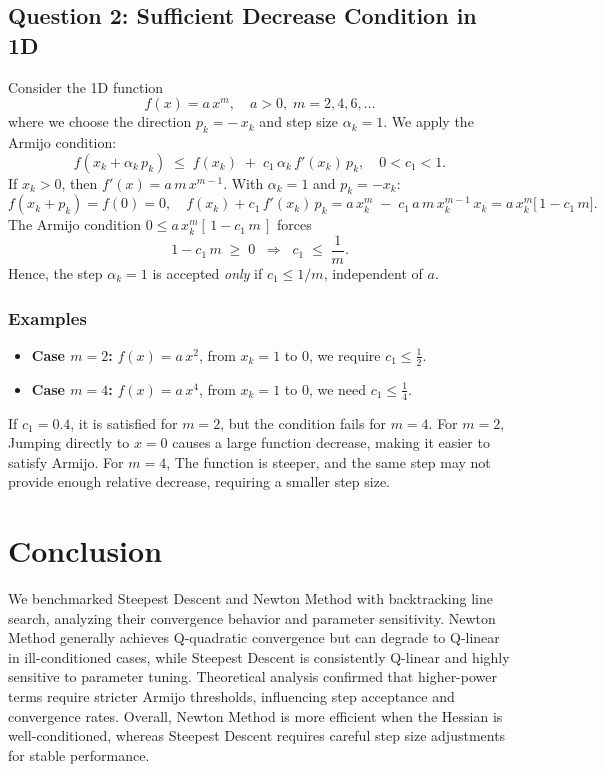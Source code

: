 \documentclass[12pt]{article}
\begin{document}
\subsection{Question 2: Sufficient Decrease Condition in 1D}

Consider the 1D function
\[
f(x) = a \, x^m, \quad a>0, \; m = 2,4,6,\dots
\]
where we choose the direction $p_k = -\,x_k$ and step size $\alpha_k=1$. 
We apply the Armijo condition:
\[
f(x_k + \alpha_k\,p_k) \; \le \; f(x_k) \;+\; c_1\,\alpha_k\,f'(x_k)\,p_k,\quad 0 < c_1 < 1.
\]
If $x_k>0$, then $f'(x) = a\,m\,x^{m-1}$. With $\alpha_k=1$ and $p_k=-x_k$:
\[
f(x_k + p_k) = f(0) = 0, 
\quad
f(x_k) + c_1\,f'(x_k)\,p_k 
= a\,x_k^m \;-\; c_1\,a\,m\,x_k^{m-1}\,x_k 
= a\,x_k^m \bigl[\,1 - c_1\,m\bigr].
\]
The Armijo condition $0 \le a\,x_k^m [\,1 - c_1\,m\,]$ forces 
\[
1 - c_1\,m \;\ge\;0 
\;\;\Longrightarrow\;\; c_1 \;\le\; \frac{1}{m}.
\]
Hence, the step $\alpha_k=1$ is accepted \emph{only} if $c_1 \le 1/m$, independent of $a$.

\subsubsection*{Examples}
\begin{itemize}
\item \textbf{Case $m=2$:} 
  $f(x)=a\,x^2$, from $x_k=1$ to $0$, we require $c_1\le\frac{1}{2}$.
\item \textbf{Case $m=4$:} 
  $f(x)=a\,x^4$, from $x_k=1$ to $0$, we need $c_1\le \frac{1}{4}$. 
\end{itemize}
If $c_1=0.4$, it is satisfied for $m=2$, but the condition fails for $m=4$. For \( m=2 \), Jumping directly to \( x=0 \) causes a large function decrease, making it easier to satisfy Armijo. For \( m=4 \), The function is steeper, and the same step may not provide enough relative decrease, requiring a smaller step size.
\section{Conclusion}
We benchmarked Steepest Descent and Newton Method with backtracking line search, analyzing their convergence behavior and parameter sensitivity. Newton Method generally achieves Q-quadratic convergence but can degrade to Q-linear in ill-conditioned cases, while Steepest Descent is consistently Q-linear and highly sensitive to parameter tuning. Theoretical analysis confirmed that higher-power terms require stricter Armijo thresholds, influencing step acceptance and convergence rates. Overall, Newton Method is more efficient when the Hessian is well-conditioned, whereas Steepest Descent requires careful step size adjustments for stable performance.
\end{document}
